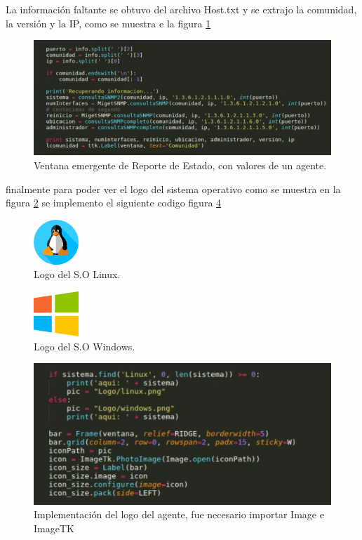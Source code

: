	
La información faltante se obtuvo del archivo Host.txt  y se extrajo la comunidad, la versión y la IP, como se muestra e la figura  \ref{image:Codigo}

\FloatBarrier
\begin{figure}[htbp!]
		\centering
	\includegraphics[width=.7 \textwidth]{images/Codigo}
		\caption{Ventana emergente de Reporte de Estado, con valores de un agente. }		\label{image:Codigo}
\end{figure}
\FloatBarrier


finalmente para poder ver el logo del sistema operativo como se muestra en la figura   \ref{image:linux} se implemento el siguiente codigo  figura      \ref{image:Cologo}

\FloatBarrier
\begin{figure}[htbp!]
		\centering
	\includegraphics[width=.2 \textwidth]{images/linux}
		\caption{Logo del S.O Linux. }		\label{image:linux}
\end{figure}
\FloatBarrier

\FloatBarrier
\begin{figure}[htbp!]
		\centering
	\includegraphics[width=.2\textwidth]{images/windows}
		\caption{Logo del S.O Windows. }		\label{image:windows}
\end{figure}
\FloatBarrier


\FloatBarrier
\begin{figure}[htbp!]
		\centering
	\includegraphics[width=.7\textwidth]{images/Cologo}
		\caption{Implementación del logo del agente, fue necesario importar Image e ImageTK }		\label{image:Cologo}
\end{figure}
\FloatBarrier